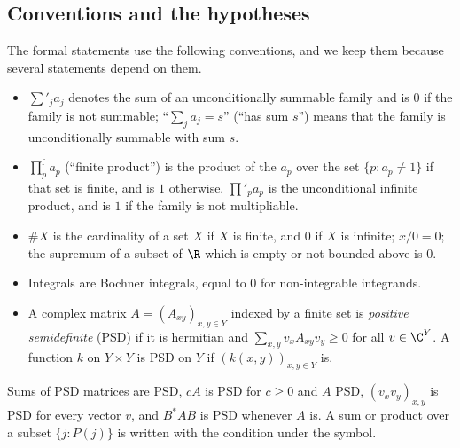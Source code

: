 \subsection{Conventions and the hypotheses}\label{pf:thmS-leaves:ss:conventions}

The formal statements use the following conventions, and we keep them because several statements depend on them.
\begin{itemize}
\item $\sum'_{j}a_j$ denotes the sum of an unconditionally summable family and is $0$ if the family is not
summable; ``$\sum_j a_j=s$'' (``has sum $s$'') means that the family is unconditionally summable with sum $s$.
\item $\prod^{\mathrm f}_p a_p$ (``finite product'') is the product of the $a_p$ over the set $\{p:a_p\ne1\}$ if that
set is finite, and is $1$ otherwise. $\prod'_p a_p$ is the unconditional infinite product, and is $1$ if the family
is not multipliable.
\item $\#X$ is the cardinality of a set $X$ if $X$ is finite, and $0$ if $X$ is infinite; $x/0=0$; the supremum of a
subset of $\R$ which is empty or not bounded above is $0$.
\item Integrals are Bochner integrals, equal to $0$ for non-integrable integrands.
\item A complex matrix $A=(A_{xy})_{x,y\in Y}$ indexed by a finite set is \emph{positive semidefinite} (PSD) if it
is hermitian and $\sum_{x,y}\overline{v_x}A_{xy}v_y\ge0$ for all $v\in\C^Y$. A function $k$ on $Y\times Y$ is PSD on
$Y$ if $(k(x,y))_{x,y\in Y}$ is.
\end{itemize}
Sums of PSD matrices are PSD, $cA$ is PSD for $c\ge0$ and $A$ PSD, $(v_x\overline{v_y})_{x,y}$ is PSD for every
vector $v$, and $B^*AB$ is PSD whenever $A$ is. A sum or product over a subset $\{j:P(j)\}$ is written with the
condition under the symbol.

